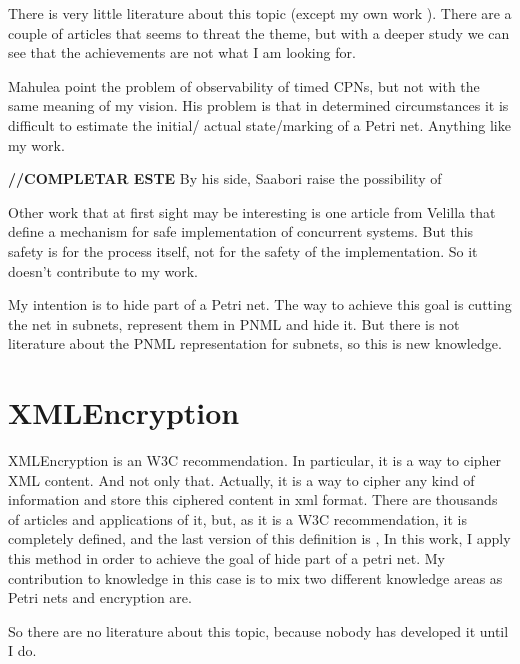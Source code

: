 There is very little literature about this topic (except my own work \cite{HID-Inigo2011MT}).
There are a couple of articles that seems to threat the theme, but with a deeper study we can see that the achievements are not what I am looking for.

Mahulea \cite{HID-Mahulea2013387} point the problem of observability of timed CPNs, but not with the same meaning of my vision. His problem is that
in determined circumstances  it is difficult to estimate the initial/ actual state/marking
of a Petri net. Anything like my work. 

\textbf{//COMPLETAR ESTE} By his side, Saabori \cite{HID-Saboori20106759} raise the possibility of

Other work that at first sight may be interesting is one article from Velilla
\cite{SM-Velilla198875} that define a mechanism for safe implementation of
concurrent systems. But this safety is for the process itself, not for the
safety of the implementation. So it doesn't contribute to my work. 
 
My intention is to hide part of a Petri net. The way to achieve this goal
is cutting the net in subnets, represent them in PNML and hide it. But there is not literature about the PNML representation for subnets, so this
is new knowledge.





\section{XMLEncryption}

XMLEncryption is an W3C recommendation. In particular, it is a way to cipher XML content. And not only that. Actually, it is a way to cipher any kind
of information and store this ciphered content in xml format. There are thousands
of articles and applications of it, but, as it is a W3C recommendation, it
is completely defined, and the last version of this definition is \cite{XMLENC-w3.org/xmlenc-core1}, In this work, I apply this method in order to achieve the goal of hide part
of a petri net. My contribution to knowledge in this case is to mix two different
knowledge areas as Petri nets
and encryption are.

So there are no literature about this topic, because nobody has developed it until I do.   



